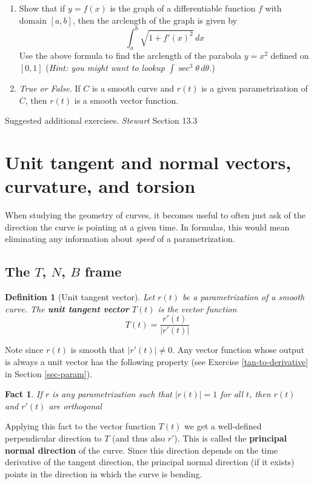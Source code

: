 \documentclass[12pt]{article}
\numberwithin{equation}{subsection}
\numberwithin{figure}{subsection}
\newtheorem{defn}[subsection]{Definition}
\newtheorem{fact}[subsection]{Fact}
\theoremstyle{note}
\begin{document}
{\begin{enumerate}[label=\arabic*.]
\item Show that if $y=f(x)$ is the graph of a differentiable function $f$ with domain $[a,b]$, then the arclength of the graph is given by \begin{equation} \int_a^b \sqrt{1+f'(x)^2}\,dx\end{equation}
Use the above formula to find the arclength of the parabola $y=x^2$ defined on $[0,1]$ (\textit{Hint: you might want to lookup $\displaystyle \int \sec^3\theta\,d \theta$.}) 

\item \textit{True or False}. If $C$ is a smooth curve and $r(t)$ is a given parametrization of $C$, then $r(t)$ is a smooth vector function. 
\end{enumerate}

Suggested additional exercises. \textit{Stewart} Section 13.3 

\section[Curvature]{Unit tangent and normal vectors, curvature, and torsion} \label{sec-curvature}

When studying the geometry of curves, it becomes useful to often just ask of the direction the curve is pointing at a given time. In formulas, this would mean eliminating any information about \textit{speed} of a parametrization. 

\subsection{The $T$, $N$, $B$ frame}
\begin{defn}[Unit tangent vector]Let $r(t)$ be a parametrization of a smooth curve. The \textbf{unit tangent vector} $T(t)$ is the vector function \begin{equation} \label{unit-tangent} T(t)= \dfrac{r'(t)}{|r'(t)|} \end{equation}
\end{defn}

Note  since $r(t)$ is smooth that $|r'(t)|\neq 0$. Any vector function whose output is always a unit vector has the following property (see Exercise \ref{tan-to-derivative} in Section \ref{sec-param}). 
\begin{fact} If $r$ is any parametrization such that $|r(t)|=1$ for all $t$, then $r(t)$ and $r'(t)$ are orthogonal\end{fact} 
Applying this fact to the vector function $T(t)$ we get a well-defined perpendicular direction to $T$ (and thus also $r'$). This is called the \textbf{principal normal direction} of the curve. Since this direction depends on the time derivative of the tangent direction, the principal normal direction (if it exists) points in the direction in which the curve is bending. 

}
\end{document}
